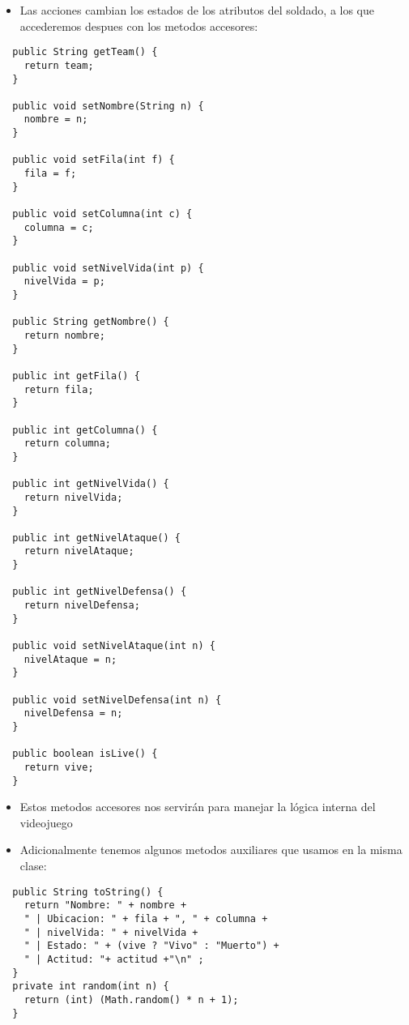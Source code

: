 \begin{itemize}
    \item Las acciones cambian los estados de los atributos del soldado, a los que accederemos despues con los metodos accesores:
\end{itemize}
\begin{lstlisting}
  public String getTeam() {
    return team; 
  }

  public void setNombre(String n) {
    nombre = n; 
  }

  public void setFila(int f) {
    fila = f; 
  }

  public void setColumna(int c) {
    columna = c; 
  }

  public void setNivelVida(int p) {
    nivelVida = p; 
  }

  public String getNombre() {
    return nombre; 
  }

  public int getFila() {
    return fila; 
  }

  public int getColumna() {
    return columna; 
  }

  public int getNivelVida() {
    return nivelVida; 
  }

  public int getNivelAtaque() {
    return nivelAtaque; 
  }

  public int getNivelDefensa() {
    return nivelDefensa; 
  }

  public void setNivelAtaque(int n) {
    nivelAtaque = n; 
  }

  public void setNivelDefensa(int n) {
    nivelDefensa = n; 
  }

  public boolean isLive() { 
    return vive; 
  }
\end{lstlisting}
\begin{itemize}
    \item Estos metodos accesores nos servirán para manejar la lógica interna del videojuego
      \item Adicionalmente tenemos algunos metodos auxiliares que usamos en la misma clase:
\end{itemize}

\begin{lstlisting}
  public String toString() {
    return "Nombre: " + nombre +
    " | Ubicacion: " + fila + ", " + columna +
    " | nivelVida: " + nivelVida + 
    " | Estado: " + (vive ? "Vivo" : "Muerto") +
    " | Actitud: "+ actitud +"\n" ;
  }
  private int random(int n) {
    return (int) (Math.random() * n + 1);
  }
\end{lstlisting}

